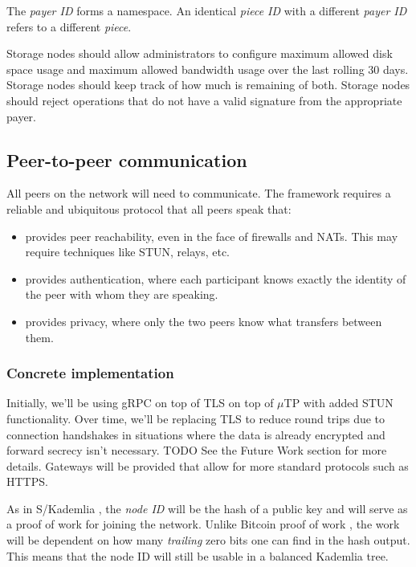 \documentclass[a4paper,10pt]{article} \usepackage[utf8]{inputenc}
\newcommand{\todo}[1]{{\color{red} TODO #1 }}
\begin{document}
The {\em payer ID} forms a namespace. An identical {\em piece ID} with a
different {\em payer ID} refers to a different {\em piece}.

Storage nodes should allow administrators to configure maximum allowed disk
space usage and maximum allowed bandwidth usage over the last rolling 30 days.
Storage nodes should keep track of how much is remaining of both. Storage nodes
should reject operations that do not have a valid signature from the appropriate
payer.

\subsection{Peer-to-peer communication}

All peers on the network will need to communicate. The framework requires a
reliable and ubiquitous protocol that all peers speak that:

\begin{itemize}
\item provides peer reachability, even in the face of firewalls
and NATs. This may require techniques like STUN, relays, etc.
\item provides authentication, where each participant knows
exactly the identity of the peer with whom they are speaking.
\item provides privacy, where only the two peers
know what transfers between them.
\end{itemize}

\subsubsection{Concrete implementation}

Initially, we'll be using gRPC \cite{grpc} on top of TLS on top of $\mu$TP
\cite{utp} with added STUN functionality. Over time, we'll be replacing TLS to
reduce round trips due to connection handshakes in situations where the data is
already encrypted and forward secrecy isn't necessary. \todo{} See the Future
Work section for more details. Gateways will be provided that allow for more
standard protocols such as HTTPS.

As in S/Kademlia \cite{skad}, the {\em node ID} will be the hash of a public key
and will serve as a proof of work for joining the network. Unlike Bitcoin proof
of work \cite{bitcoin}, the work will be dependent on how many {\em trailing}
zero bits one can find in the hash output. This means that the node ID will
still be usable in a balanced Kademlia \cite{kad} tree.
\end{document}
